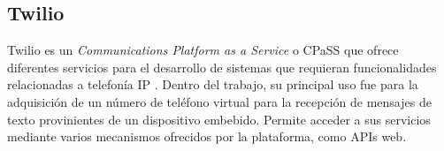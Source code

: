 \subsection{Twilio}

Twilio es un \textit{Communications Platform as a Service} o CPaSS que ofrece diferentes servicios para el desarrollo de sistemas que requieran funcionalidades relacionadas a telefonía IP \citep{TWILIO:1}. Dentro del trabajo, su principal uso fue para la adquisición de un número de teléfono virtual para la recepción de mensajes de texto provinientes de un dispositivo embebido. Permite acceder a sus servicios mediante varios mecanismos ofrecidos por la plataforma, como APIs web.